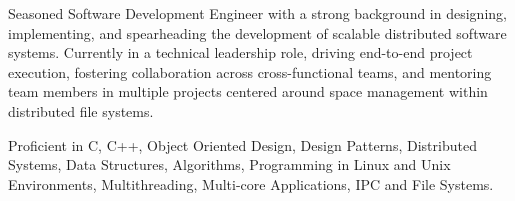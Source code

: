 

\begin{cvparagraph}

 Seasoned Software Development Engineer with a strong background in designing, implementing, and spearheading the development of scalable distributed software systems. Currently in a technical leadership role, driving end-to-end project execution, fostering collaboration across cross-functional teams, and mentoring team members in multiple projects centered around space management within distributed file systems.
\end{cvparagraph}


\begin{cvparagraph}
 Proficient in C, C++, Object Oriented Design, Design Patterns, Distributed Systems, Data Structures, Algorithms, Programming in Linux and Unix
Environments, Multithreading, Multi-core Applications, IPC and File Systems.
\end{cvparagraph}
